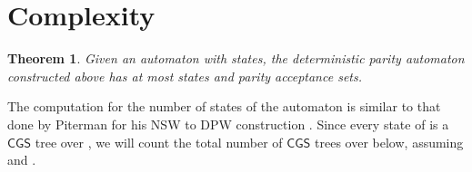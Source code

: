 \documentclass[3p]{elsarticle}
\newtheorem{theorem}{Theorem}
\newcommand{\CGS}{\ensuremath{\textsf{CGS }}}
\begin{document}
 

\section{Complexity}
\label{sec:inf-set-size}






\begin{theorem}\label{count-thm}
Given an automaton  with  states, the deterministic parity
automaton  constructed above has at most  states
and  parity acceptance sets.
\end{theorem}

The computation for the number of states of the automaton  is
similar to that done by Piterman for his NSW to DPW construction
\cite{piterman}.  Since every state of  is a \CGS tree over
, we will count the total number of \CGS trees over  below,
assuming  and .
\end{document}
